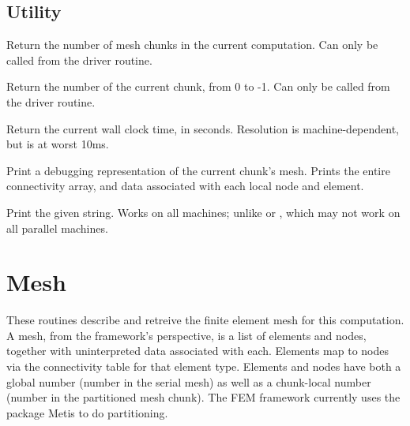 \documentclass[10pt]{article}
\begin{document}
\subsection{Utility}


     Return the number of mesh chunks in the current computation.  Can
     only be called from the driver routine.


     Return the number of the current chunk, from 0 to
     -1.  Can only be called from the driver routine.


     Return the current wall clock time, in seconds.  Resolution is
     machine-dependent, but is at worst 10ms.


     Print a debugging representation of the current chunk's mesh.
     Prints the entire connectivity array, and data associated with
     each local node and element.


     Print the given string.  Works on all machines; unlike  or
     , which may not work on all parallel machines.

\section{Mesh}

These routines describe and retreive the finite element mesh for this
computation.  A mesh, from the framework's perspective, is a list of
elements and nodes, together with uninterpreted data associated with each.
Elements map to nodes via the connectivity table for that element type.
Elements and nodes have both a global number (number in
the serial mesh) as well as a chunk-local number (number in the partitioned
mesh chunk).  The FEM framework currently uses the package Metis to do 
partitioning.
\end{document}
